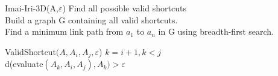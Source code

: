 \begin{algorithm}{Imai-Iri-3D}{(A,$\varepsilon$)}
 Find all possible valid shortcuts \\
Build a graph G containing all valid shortcuts. \\
Find a minimum link path from $a_{1}$ to $a_{n}$  in G using breadth-first search.
      \end{algorithm} 
      
      \begin{algorithm}{ValidShortcut}{$(A, A_{i},A_{j},\varepsilon$)}
      \qfor $k = i+1, k < j$\\
       \qif d(evaluate$(A_{k},A_{i},A_{j}), A_{k}) > \varepsilon$ \\ 
       \qreturn \qfalse \qfi \qrof \\
       \qreturn \qtrue
      \end{algorithm} 
      